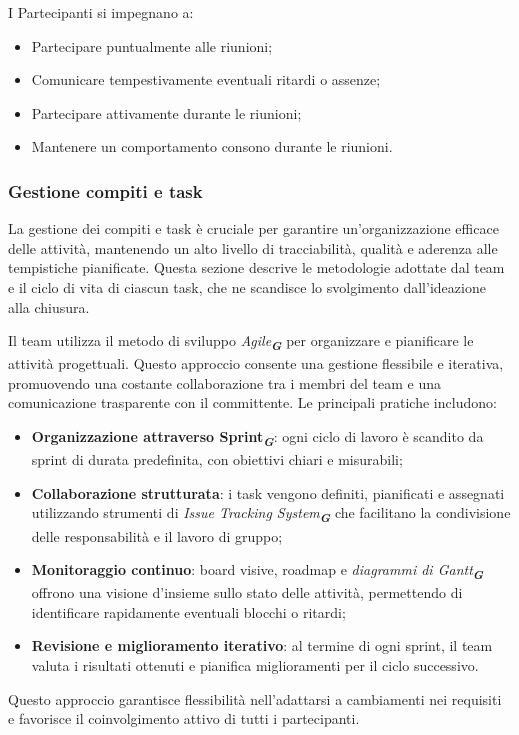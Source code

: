 I Partecipanti si impegnano a:
\begin{itemize}
    \item Partecipare puntualmente alle riunioni;
    \item Comunicare tempestivamente eventuali ritardi o assenze;
    \item Partecipare attivamente durante le riunioni;
    \item Mantenere un comportamento consono durante le riunioni.
\end{itemize}

\subsubsection{Gestione compiti e task}
La gestione dei compiti e task è cruciale per garantire un’organizzazione efficace delle attività, mantenendo un alto livello di tracciabilità, qualità e aderenza alle tempistiche pianificate. 
Questa sezione descrive le metodologie adottate dal team e il ciclo di vita di ciascun task, che ne scandisce lo svolgimento dall’ideazione alla chiusura.

Il team utilizza il metodo di sviluppo \emph{Agile}\textsubscript{\textit{\textbf{G}}} per organizzare e pianificare le attività progettuali. 
Questo approccio consente una gestione flessibile e iterativa, promuovendo una costante collaborazione tra i membri del team e una comunicazione trasparente con il committente. 
Le principali pratiche includono:
\begin{itemize}
    \item \textbf{Organizzazione attraverso Sprint\textsubscript{\textit{\textbf{G}}}}: ogni ciclo di lavoro è scandito da sprint di durata predefinita, con obiettivi chiari e misurabili;
    \item \textbf{Collaborazione strutturata}: i task vengono definiti, pianificati e assegnati utilizzando strumenti di \emph{Issue Tracking System}\textsubscript{\textit{\textbf{G}}} che facilitano la condivisione delle responsabilità e il lavoro di gruppo;
    \item \textbf{Monitoraggio continuo}: board visive, roadmap e \emph{diagrammi di Gantt}\textsubscript{\textit{\textbf{G}}} offrono una visione d'insieme sullo stato delle attività, permettendo di identificare rapidamente eventuali blocchi o ritardi;
    \item \textbf{Revisione e miglioramento iterativo}: al termine di ogni sprint, il team valuta i risultati ottenuti e pianifica miglioramenti per il ciclo successivo.
\end{itemize}
Questo approccio garantisce flessibilità nell'adattarsi a cambiamenti nei requisiti e favorisce il coinvolgimento attivo di tutti i partecipanti.

